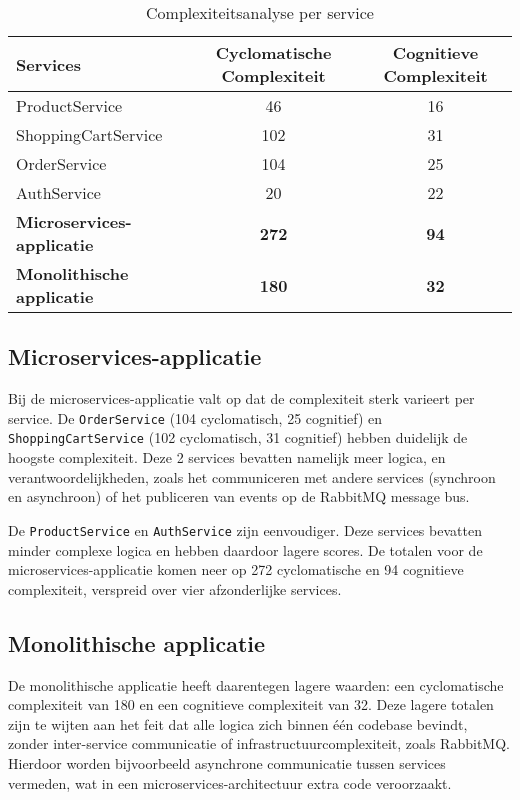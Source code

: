 \begin{table}[H]
	\centering
	\begin{tabular}{|l|c|c|}
		\hline
		\textbf{Services} & \textbf{Cyclomatische Complexiteit} & \textbf{Cognitieve Complexiteit} \\
		\hline
		ProductService        & 46 & 16 \\
		ShoppingCartService   & 102  & 31 \\
		OrderService          & 104 & 25 \\
		AuthService           & 20  & 22 \\
		\hline
		\textbf{Microservices-applicatie} & \textbf{272} & \textbf{94} \\
		\hline
		\textbf{Monolithische applicatie} & \textbf{180} & \textbf{32} \\
		\hline
	\end{tabular}
	\caption{Complexiteitsanalyse per service}
\end{table}

\subsection{Microservices-applicatie}

Bij de microservices-applicatie valt op dat de complexiteit sterk varieert per service. De \texttt{OrderService} (104 cyclomatisch, 25 cognitief) en \texttt{ShoppingCartService} (102 cyclomatisch, 31 cognitief) hebben duidelijk de hoogste complexiteit. Deze 2 services bevatten namelijk meer logica, en verantwoordelijkheden, zoals het communiceren met andere services (synchroon en asynchroon) of het publiceren van events op de RabbitMQ message bus.\newline

De \texttt{ProductService} en \texttt{AuthService} zijn eenvoudiger. Deze services bevatten minder complexe logica en hebben daardoor lagere scores. De totalen voor de microservices-applicatie komen neer op 272 cyclomatische en 94 cognitieve complexiteit, verspreid over vier afzonderlijke services.

\subsection{Monolithische applicatie}

De monolithische applicatie heeft daarentegen lagere waarden: een cyclomatische complexiteit van 180 en een cognitieve complexiteit van 32. Deze lagere totalen zijn te wijten aan het feit dat alle logica zich binnen één codebase bevindt, zonder inter-service communicatie of infrastructuurcomplexiteit, zoals RabbitMQ. Hierdoor worden bijvoorbeeld asynchrone communicatie tussen services vermeden, wat in een microservices-architectuur extra code veroorzaakt.\newline

